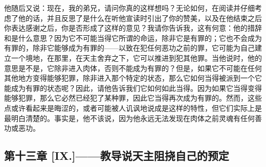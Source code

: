 他随后又说：现在，我的弟兄，请问你真的这样想吗？无论如何，在阅读并仔细考虑了他的话，并且反思了是什么在听他宣读时引出了你的赞美，以及在他结束之后你表达感谢之后，你是否形成了这样的意见？我请你告诉我，这有何意：他的措辞和是什么意思？因为它不可能当得它所谓的命运，除非它是有罪的；它也不会成为有罪的，除非它能够成为有罪的——以致在犯任何恶功之前的罪，它可能为自己建立一个境地，在那里，在天主舍弃之下，它可以推进到犯其他罪。当他说时，他的意思是不是，它除非进入肉体，否则不能成为有罪的？但是，如果它不可能在任何其他地方变得能够犯罪，除非进入那个特定的状态，那么它如何当得被派到一个它能成为有罪的状态呢？因此，请他告诉我们它如何如此当得。因为如果它当得变得能够犯罪，那么它必然已经犯了某种罪，因此它当得再次成为有罪的。然而，这些点或许看起来是晦涩的，或者可能被人讥讽地说成是这样的特性，但它们实际上是最明白清楚的。事实是，他不该说，因为他永远无法发现在肉体之前灵魂有任何善功或恶功。\par


\subsection{第十三章 [IX.]——教导说天主阻挠自己的预定}

